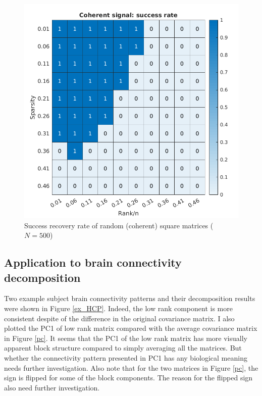 \documentclass[12pt]{extarticle}
\newcommand{\<}{\langle}
\renewcommand{\>}{\rangle}
\theoremstyle{definition}
\begin{document}
\begin{figure}
\begin{minipage}{0.45\textwidth}
    \includegraphics[width=\linewidth]{Coherent_TransitionPlot.png}
    \end{minipage}
    \caption{Success recovery rate of random (coherent) square matrices ($N=500$)}
\end{figure}


\subsection{Application to brain connectivity decomposition}
Two example subject brain connectivity patterns and their decomposition results were shown in Figure \ref{ex_HCP}. Indeed, the low rank component is more consistent despite of the difference in the original covariance matrix. I also plotted the PC1 of low rank matrix compared with the average covariance matrix in Figure \ref{pc}. It seems that the PC1 of the low rank matrix has more visually apparent block structure compared to simply averaging all the matrices. But whether the connectivity pattern presented in PC1 has any biological meaning needs further investigation. Also note that for the two matrices in Figure \ref{pc}, the sign is flipped for some of the block components. The reason for the flipped sign also need further investigation.  
\end{document}
